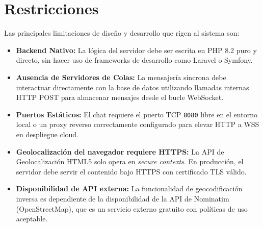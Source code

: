 \documentclass[11pt,a4paper]{report}
\begin{document}
\section{Restricciones}
Las principales limitaciones de diseño y desarrollo que rigen al sistema son:
\begin{itemize}
    \item \textbf{Backend Nativo:} La lógica del servidor debe ser escrita en PHP 8.2 puro y directo, sin hacer uso de frameworks de desarrollo como Laravel o Symfony.
    \item \textbf{Ausencia de Servidores de Colas:} La mensajería síncrona debe interactuar directamente con la base de datos utilizando llamadas internas HTTP POST para almacenar mensajes desde el bucle WebSocket.
    \item \textbf{Puertos Estáticos:} El chat requiere el puerto TCP \texttt{8080} libre en el entorno local o un proxy reverso correctamente configurado para elevar HTTP a WSS en despliegue cloud.
    \item \textbf{Geolocalización del navegador requiere HTTPS:} La API de Geolocalización HTML5 solo opera en \textit{secure contexts}. En producción, el servidor debe servir el contenido bajo HTTPS con certificado TLS válido.
    \item \textbf{Disponibilidad de API externa:} La funcionalidad de geocodificación inversa es dependiente de la disponibilidad de la API de Nominatim (OpenStreetMap), que es un servicio externo gratuito con políticas de uso aceptable.
\end{itemize}
\end{document}
